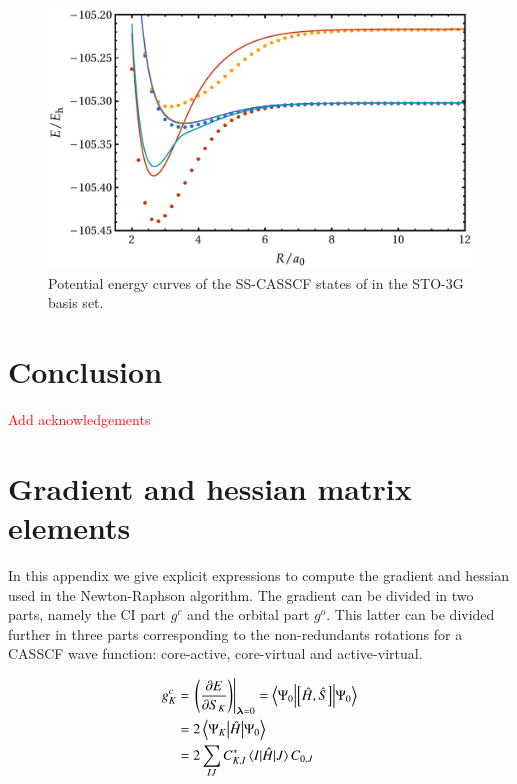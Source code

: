 \documentclass[aps,prb,reprint,showkeys,superscriptaddress]{revtex4-1}
\newcommand{\todo}[1]{\textcolor{red}{#1}}
\begin{document}
\begin{figure}
  \centering
  \includegraphics[width=0.9\linewidth]{Figures/fig_7.pdf}
  \caption{Potential energy curves of the SS-CASSCF states of  in the STO-3G basis set. \label{fig:fig_7}}
\end{figure}

\section{Conclusion}
\label{sec:conclusion}

\begin{acknowledgements}
\todo{Add acknowledgements}
\end{acknowledgements}

\appendix

\section{Gradient and hessian matrix elements}
\label{app:appendixA}

In this appendix we give explicit expressions to compute the gradient and hessian used in the Newton-Raphson algorithm.
The gradient can be divided in two parts, namely the CI part $g^c$ and the orbital part $g^o$.
This latter can be divided further in three parts corresponding to the non-redundants rotations for a CASSCF wave function: core-active, core-virtual and active-virtual.

\begin{align}
  \label{eq:CASSCF_CI_Gradient}
  g^c_{K} &= \eval{\mleft(\pdv{E}{S_{K}}\mright)}_{\bm{\lambda}=0} = \mel**{\Psi_0}{\com{\hH}{\hS}}{\Psi_0} \\
          &= 2\mel**{\Psi_K}{\hH}{\Psi_0} \notag \\
          &= 2\sum_{IJ}C_{K,I}^*\mel{I}{\hH}{J}C_{0,J} \notag
\end{align}
\end{document}

